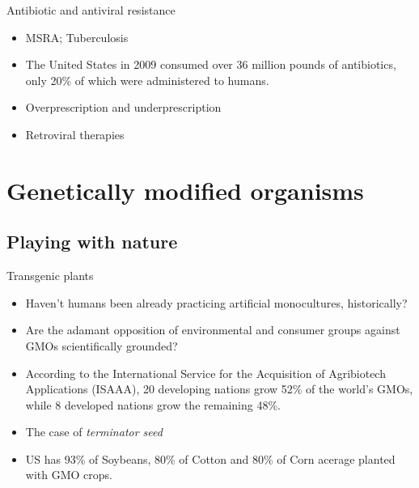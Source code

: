 \documentclass[ignorenonframetext,aspectratio=169]{beamer}
\providecommand{\tightlist}{%
  \setlength{\itemsep}{0pt}\setlength{\parskip}{0pt}}
\begin{document}
\begin{frame}{Antibiotic and antiviral resistance}
\protect\hypertarget{antibiotic-and-antiviral-resistance}{}

\begin{itemize}
\tightlist
\item
  MSRA; Tuberculosis
\item
  The United States in 2009 consumed over 36 million pounds of
  antibiotics, only 20\% of which were administered to humans.
\item
  Overprescription and underprescription
\item
  Retroviral therapies
\end{itemize}

\end{frame}

\hypertarget{genetically-modified-organisms}{%
\section{Genetically modified
organisms}\label{genetically-modified-organisms}}

\hypertarget{playing-with-nature}{%
\subsection{Playing with nature}\label{playing-with-nature}}

\begin{frame}{Transgenic plants}
\protect\hypertarget{transgenic-plants}{}

\begin{itemize}
\tightlist
\item
  Haven't humans been already practicing artificial monocultures,
  historically?
\item
  Are the adamant opposition of environmental and consumer groups
  against GMOs scientifically grounded?
\item
  According to the International Service for the Acquisition of
  Agribiotech Applications (ISAAA), 20 developing nations grow 52\% of
  the world's GMOs, while 8 developed nations grow the remaining 48\%.
\item
  The case of \emph{terminator seed}
\item
  US has 93\% of Soybeans, 80\% of Cotton and 80\% of Corn acerage
  planted with GMO crops.
\end{itemize}

\end{frame}
\end{document}
